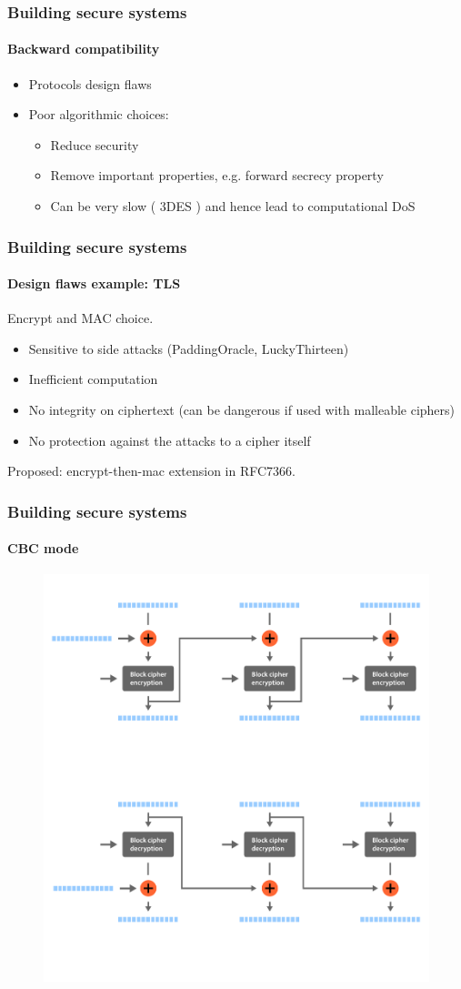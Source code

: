 \documentclass[11pt,t]{beamer}
\newcommand{\cipher}[1]{
	{\color{blue!30} #1}
}
\begin{document}
\begin{frame}
\frametitle{Building secure systems}
\framesubtitle{Backward compatibility}
\begin{itemize}
\item<1-> Protocols design flaws
\item<2-> Poor algorithmic choices:
	\begin{itemize}
	\item Reduce security
	\item Remove important properties, e.g. forward secrecy property
	\item Can be very slow (\cipher{3DES}) and hence lead to computational DoS
	\end{itemize}
\end{itemize}
\end{frame}

\begin{frame}
\frametitle{Building secure systems}
\framesubtitle{Design flaws example: TLS}
Encrypt and MAC choice.
\begin{itemize}
\item Sensitive to side attacks (PaddingOracle, LuckyThirteen)
\item Inefficient computation
\item No integrity on ciphertext (can be dangerous if used with malleable ciphers)
\item No protection against the attacks to a cipher itself
\end{itemize}
Proposed: encrypt-then-mac extension in RFC7366.
\end{frame}

\begin{frame}[fragile]
\frametitle{Building secure systems}
\framesubtitle{CBC mode}
\begin{figure}[H]
\includegraphics[height=0.85\textheight]{cbc.pdf}
\end{figure}
\end{frame}
\end{document}
